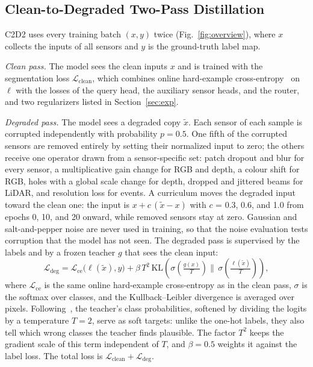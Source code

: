 \subsection{Clean-to-Degraded Two-Pass Distillation}\label{sec:m_c2d2}
C2D2 uses every training batch $(x, y)$ twice (Fig.~\ref{fig:overview}), where $x$ collects the inputs of all sensors and $y$ is the ground-truth label map.

\emph{Clean pass.} The model sees the clean inputs $x$ and is trained with the segmentation loss $\mathcal{L}_{\mathrm{clean}}$, which combines online hard-example cross-entropy~\cite{ohem2016} on $\ell$ with the losses of the query head, the auxiliary sensor heads, and the router, and two regularizers listed in Section~\ref{sec:exp}.

\emph{Degraded pass.} The model sees a degraded copy $\tilde{x}$. Each sensor of each sample is corrupted independently with probability $p=0.5$. One fifth of the corrupted sensors are removed entirely by setting their normalized input to zero; the others receive one operator drawn from a sensor-specific set: patch dropout and blur for every sensor, a multiplicative gain change for RGB and depth, a colour shift for RGB, holes with a global scale change for depth, dropped and jittered beams for LiDAR, and resolution loss for events. A curriculum moves the degraded input toward the clean one: the input is $x+c\,(\tilde{x}-x)$ with $c$ = 0.3, 0.6, and 1.0 from epochs 0, 10, and 20 onward, while removed sensors stay at zero. Gaussian and salt-and-pepper noise are never used in training, so that the noise evaluation tests corruption that the model has not seen. The degraded pass is supervised by the labels and by a frozen teacher $g$ that sees the clean input:
\begin{equation}
\mathcal{L}_{\mathrm{deg}} = \mathcal{L}_{\mathrm{ce}}\big(\ell(\tilde{x}), y\big) + \beta\, T^2\, \mathrm{KL}\!\left(\sigma\!\left(\tfrac{g(x)}{T}\right) \Big\|\, \sigma\!\left(\tfrac{\ell(\tilde{x})}{T}\right)\right),
\end{equation}
where $\mathcal{L}_{\mathrm{ce}}$ is the same online hard-example cross-entropy as in the clean pass, $\sigma$ is the softmax over classes, and the Kullback--Leibler divergence is averaged over pixels. Following~\cite{hinton2015kd}, the teacher's class probabilities, softened by dividing the logits by a temperature $T=2$, serve as soft targets: unlike the one-hot labels, they also tell which wrong classes the teacher finds plausible. The factor $T^2$ keeps the gradient scale of this term independent of $T$, and $\beta=0.5$ weights it against the label loss. The total loss is $\mathcal{L}_{\mathrm{clean}} + \mathcal{L}_{\mathrm{deg}}$.


